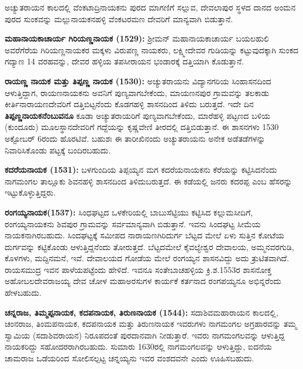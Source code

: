 \vskip 3pt

ಅಚ್ಯುತರಾಯನ ಕಾಲದಲ್ಲಿ ವೆಂಕಟಾದ್ರಿನಾಯಕನು ಪುರದ ಮಾಗಣಿಗೆ ಸಲ್ಲುವ, ದೇವಲಾಪುರ ಸ್ಥಳದ ದಾನದ ಅಂಮನ ಪುರದ ಸುಂಕವನ್ನು ಮಲ್ಲುನಾಯಕನಹಳ್ಳಿ ವೆಂಕಟರಮಣ ದೇವರಿಗೆ ಮಾನ್ಯವಾಗಿ ಬಿಡುತ್ತಾನೆ.

\vskip 3pt

\textbf{ಮಹಾನಾಯಕಾಚಾರ್ಯ ಗಿರಿಯಣ್ಣನಾಯಕ (1529):} ಶ‍್ರೀಮನ್​ ಮಹಾನಾಯಕಾಚಾರ್ಯ ಬಯಲಹುಲಿ ಅವರೆಗೆರೆಯ ಗಿರಿಯಣ್ಣನಾಯಕರ ಮಕ್ಕಳು ವಿರುಪಣ್ಣ ನಾಯಕರು, ಲಕ್ಷ್ಮೀದೇವರ ಗುಡಿಯನ್ನು ಕಟ್ಟುವುದಕ್ಕಾಗಿ ಸುಂಕದ ಗದ್ಯಾಣ 14 ವರಹವನ್ನು, ದೇವರ ಹಳ್ಳಿಯ ತಪಸೀರಾಯನ ಭಂಡಾರಕ್ಕೆ ದತ್ತಿಯಾಗಿ ಕೊಡುತ್ತಾನೆ.

\vskip 3pt

\textbf{ರಾಯಣ್ಣ ನಾಯಕ ಮತ್ತು ತಿಪ್ಪಣ್ಣ ನಾಯಕ (1530):} ಅಚ್ಯುತರಾಯನು ವಿದ್ಯಾನಗರಿಯ ಸಿಂಹಾಸನದಿಂದ ಆಳುತ್ತಿದ್ದಾಗ, ರಾಯಣ\-ನಾಯಕನು ಅವನಿಗೆ ಪುಣ್ಯವಾಗಬೇಕೆಂದು, ಮಾಯಣನಪುರ ಗ್ರಾಮವನ್ನು ತಲಕಾಡು ಕೀರ್ತಿನಾರಾಯಣದೇವರಿಗೆ ದತ್ತಿಬಿಟ್ಟ\-ನೆಂದು ಕೊಡಗಹಳ್ಳಿ ಶಾಸನದಿಂದ ತಿಳಿದು ಬರುತ್ತದೆ. ಇದೇ ದಿನ \textbf{ತಿಪ್ಪಣ್ಣನಾಯಕನೆಂಬುವನೂ} ಕೂಡಾ ಅಚ್ಯುತರಾಯರಿಗೆ ಪುಣ್ಯವಾಗಬೇಕೆಂದು, ಮಾರೆಹಳ್ಳಿ ಪಟ್ಟಣದ ಬಳಿಯ (ಕುಂದೂರು) ಮೂಲಸ್ಥಾನದೇವರಿಗೆ ಗದ್ದೆಯನ್ನು ಕೃಷ್ಣವೇಣಿ ತೀರದಲ್ಲಿ ದತ್ತಿಬಿಡುತ್ತಾನೆ. ಈ ಶಾಸನಗಳು 1530 ಅಕ್ಟೋಬರ್​ 6ರಂದು ಹೊರಟಿವೆ. ಬಹುಶಃ ಈ ತಾರೀಖಿನಂದು ಅಚ್ಯುತರಾಯನು ಅನೇಕ ಅಡೆತಡೆಗಳನ್ನು ನಿವಾರಿಸಿಕೊಂಡು ಪಟ್ಟಕ್ಕೆ ಬಂದಿರಬಹುದು.

\vskip 3pt

\textbf{ಕದರೆಯನಾಯಕ (1531):} ಬಳಗುಂದಿಯ ತಿಪ್ಪಯ್ಯನ ಮಗ ಕದರೆಯನಾಯಕನು ಕೆರೆಯನ್ನು ಕಟ್ಟಿಸಿದನೆಂದು ನಾಗಮಂಗಲ ತಾಲ್ಲೂಕು ಶಿವನಹಳ್ಳಿ ಶಾಸನದಿಂದ ತಿಳಿದುಬರುತ್ತದೆ. ಈ ಕಡೆಯಲ್ಲಿ ಜನರು ಕದರಪ್ಪ ಎಂಬ ಹೆಸರನ್ನು ಇಟ್ಟುಕೊಳ್ಳುತ್ತಿದ್ದರು.

\vskip 3pt

\textbf{ರಂಗಯ್ಯನಾಯಕ(1537):} ಸಿಂಧಘಟ್ಟದ ಒಳಕೇರಿಯಲ್ಲಿ ಬಾಬುಸೆಟ್ಟಿಯು ಕಟ್ಟಿಸಿದ ಕಲ್ಲುಮಸೀದಿಗೆ, ರಂಗಯ್ಯ\-ನಾಯಕನು ಶಿವಪುರ ಗ್ರಾಮವನ್ನು ಸರ್ವಮಾನ್ಯವಾಗಿ ಬಿಡುತ್ತಾನೆ. ಇವನು ಸಿಂದಘಟ್ಟ ಸೀಮೆಯ ನಾಯಕನಾಗಿರಬಹುದು. ಸಿಂದಘಟ್ಟಕ್ಕೆ ಸಮೀಪದ ನಾರಾಯಣಗಿರಿದುರ್ಗ ಬೆಟ್ಟದ ಮೇಲೆ ಏಳು ಸುತ್ತಿನ ಕೋಟೆಯ ದುರ್ಗವನ್ನು ಕಟ್ಟಿಕೊಂಡು ಆಳುತ್ತಿದ್ದನೆಂದು ತೋರುತ್ತದೆ. ಬೆಟ್ಟದಮೇಲೆ ಕೈವಲ್ಯೇಶ್ವರ ದೇವಾಲಯ, ಅಮ್ಮನವರಗುಡಿ, ಕೊಳಗಳು, ಮದ್ದಿನಮನೆ, ಇವೆ. ದೇವಾಲಯದ ಗೋಡೆಯ ಮೇಲೆ ರಂಗಯ್ಯನ ಶಾಸನವಿದ್ದು ಅದು ತ್ರುಟಿತವಾಗಿದೆ. ರಾಯಸಮುದ್ರ ಇವನ ಪಾಳೆಯಪಟ್ಟೆಂದು ಹೇಳಿದೆ. ಇವನೂ ಸಂತೇಬಾಚಹಳ್ಳಿಯ ಕ್ರಿ.ಶ.1553ರ ಶಾಸನೋಕ್ತ ಅಹೋಬಲದೇವರಾಜಯ್ಯ ದೇವ ಚೋಳ ಮಹಾಅರಸುಗಳ ಕಾರ್ಯಕೆ ಕರ್ತನಾದ ರಂಗಪಯ್ಯನೂ ಅಭಿನ್ನರೆಂದು ಹೇಳಬಹುದು.

\vskip 3pt

\textbf{ಚನ್ನರಾಜ, ತಿಮ್ಮಪ್ಪನಾಯಕ, ಕದಪನಾಯಕ, ತಿರುಣನಾಯಕ (1544):} ಸದಾಶಿವಮಹಾರಾಯನ ಕಾಲದಲ್ಲಿ, ಚಂನರಾಜ, ತಿಂಮಪನಾಯಕ, ಕದಪನಾಯಕ ಮತ್ತು ತಿರುಣನಾಯಕ ಇವರುಗಳು ನಾಗಮಂಗಲ ಅಗ್ರಹಾರವನ್ನು ತಮ್ಮ ಸ್ವಾಮಿಯ (ಸದಾಶಿವರಾಯನ) ನಿರೂಪದಂತೆ ಪುರದಾನವಾಗಿ ನೀಡುತ್ತಾರೆ. ಇವರು ನಾಗಮಂಗಲವನ್ನು ಆಳುತ್ತಿದ್ದ ನಾಯಕರಿದ್ದು ಸಹೋದರರಾಗಿರಬಹುದು. ಸುಮಾರು 1630ರಲ್ಲಿ ನಾಗಮಂಗಲವನ್ನು ಆಳುತ್ತಿದ್ದು, ಐದನೆಯ ಚಾಮರಾಜ ಒಡೆಯರಿಂದ ಸೋಲಿಸಲ್ಪಟ್ಟ ಚನ್ನಯ್ಯನು ಇವರ ವಂಶದವನೇ ಎಂದು ಊಹಿಸಬಹುದು.

